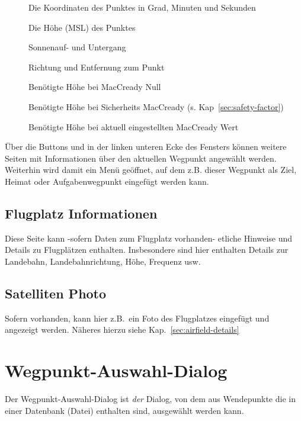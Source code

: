 \begin{description}
\item[] Die Koordinaten des Punktes in Grad, Minuten und Sekunden
\item[] Die Höhe (MSL) des Punktes
\item[] Sonnenauf- und Untergang
\item[] Richtung und Entfernung zum Punkt
\item[] Benötigte Höhe bei MacCready Null
\item[] Benötigte Höhe bei Sicherheits MacCready (s. Kap~\ref{sec:safety-factor})
\item[] Benötigte Höhe bei  aktuell eingestellten MacCready Wert
\end{description}

Über die Buttons \button{$<$} und \button{$>$} in der linken unteren Ecke des Fensters können weitere Seiten mit Informationen über den aktuellen Wegpunkt angewählt werden. Weiterhin wird damit ein Menü geöffnet, auf dem z.B. dieser Wegpunkt als Ziel, Heimat oder Aufgabenwegpunkt eingefügt werden kann.


\subsection*{Flugplatz Informationen}
Diese Seite kann -sofern Daten zum Flugplatz vorhanden- etliche Hinweise und Details zu Flugplätzen enthalten. 
Insbesondere sind hier enthalten Details zur Landebahn, Landebahnrichtung, Höhe, Frequenz usw.



\subsection*{Satelliten Photo}
Sofern vorhanden, kann hier z.B.\ ein Foto des Flugplatzes eingefügt und angezeigt werden. 
Näheres hierzu siehe Kap.~\ref{sec:airfield-details} 




\section{Wegpunkt-Auswahl-Dialog}\label{sec:waypoint-selector-dialog}
Der Wegpunkt-Auswahl-Dialog ist \textsl{der} Dialog, von dem aus Wendepunkte die in einer Datenbank (Datei) enthalten sind, ausgewählt werden kann.

